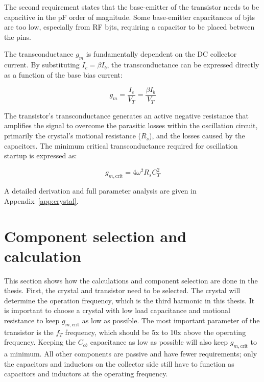 The second requirement states that the base-emitter of the transistor needs to be capacitive in the pF order of magnitude. Some base-emitter capacitances of \glspl{bjt} are too low, especially from RF \glspl{bjt}, requiring a capacitor to be placed between the pins.

The transconductance $g_m$ is fundamentally dependent on the DC collector current. By substituting $I_c = \beta I_b$, the transconductance can be expressed directly as a function of the base bias current:

\begin{equation}
	g_m = \frac{I_c}{V_T} = \frac{\beta I_b}{V_T}
\end{equation}

The transistor's transconductance generates an active negative resistance that amplifies the signal to overcome the parasitic losses within the oscillation circuit, primarily the crystal's motional resistance ($R_s$), and the losses caused by the capacitors. The minimum critical transconductance required for oscillation startup is expressed as:

\begin{equation}
	g_{m,\text{crit}} = 4 \omega^2 R_s C_T^2
\end{equation}

A detailed derivation and full parameter analysis are given in Appendix~\ref{app:crystal}.
 
\section{Component selection and calculation}

 This section shows how the calculations and component selection are done in the thesis. First, the crystal and transistor need to be selected. The crystal will determine the operation frequency, which is the third harmonic in this thesis. It is important to choose a crystal with low load capacitance and motional resistance to keep $g_{m,\text{crit}}$ as low as possible. The most important parameter of the transistor is the $f_T$ frequency, which should be 5x to 10x above the operating frequency. Keeping the $C_{cb}$ capacitance as low as possible will also keep $g_{m,\text{crit}}$ to a minimum. All other components are passive and have fewer requirements; only the capacitors and inductors on the collector side still have to function as capacitors and inductors at the operating frequency.
 
%
%
%
%
%
%
%
%
%
%
%
 
